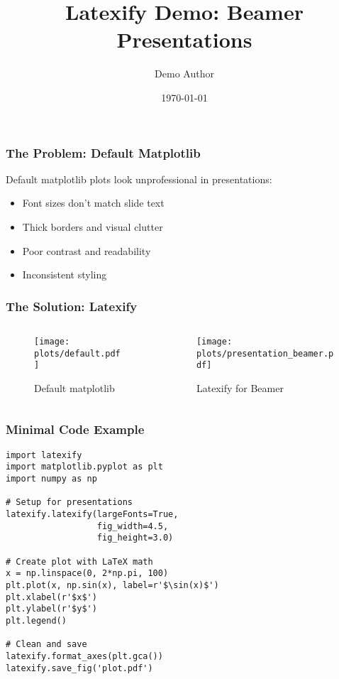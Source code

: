 \documentclass{beamer}
\title{Latexify Demo: Beamer Presentations}
\author{Demo Author}
\institute{Sustainability Lab}
\date{\today}
\begin{document}
\frame{\titlepage}

\begin{frame}
\frametitle{The Problem: Default Matplotlib}

Default matplotlib plots look unprofessional in presentations:
\begin{itemize}
    \item Font sizes don't match slide text
    \item Thick borders and visual clutter
    \item Poor contrast and readability
    \item Inconsistent styling
\end{itemize}

\end{frame}

\begin{frame}
\frametitle{The Solution: Latexify}

\begin{columns}
\begin{column}{0.5\textwidth}
    \begin{figure}
        \centering
        \texttt{[image: plots/default.pdf]}
        \caption{Default matplotlib}
    \end{figure}
\end{column}
\begin{column}{0.5\textwidth}
    \begin{figure}
        \centering
        \texttt{[image: plots/presentation\_beamer.pdf]}
        \caption{Latexify for Beamer}
    \end{figure}
\end{column}
\end{columns}

\end{frame}

\begin{frame}[fragile]
\frametitle{Minimal Code Example}

\begin{lstlisting}
import latexify
import matplotlib.pyplot as plt
import numpy as np

# Setup for presentations
latexify.latexify(largeFonts=True, 
                  fig_width=4.5, 
                  fig_height=3.0)

# Create plot with LaTeX math
x = np.linspace(0, 2*np.pi, 100)
plt.plot(x, np.sin(x), label=r'$\sin(x)$')
plt.xlabel(r'$x$')
plt.ylabel(r'$y$')
plt.legend()

# Clean and save
latexify.format_axes(plt.gca())
latexify.save_fig('plot.pdf')
\end{lstlisting}

\end{frame}
\end{document}

